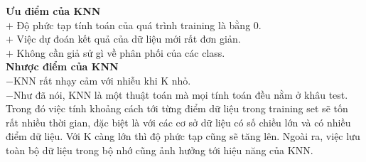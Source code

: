 \documentclass{article}
\begin{document}
\textbf{Ưu điểm của KNN}
\\
$+$ Độ phức tạp tính toán của quá trình training là bằng 0.
\\
$+$ Việc dự đoán kết quả của dữ liệu mới rất đơn giản.
\\
$+$ Không cần giả sử gì về phân phối của các class.
\\
\textbf{Nhược điểm của KNN}
\\
$-$KNN rất nhạy cảm với nhiễu khi K nhỏ.
\\
$-$Như đã nói, KNN là một thuật toán mà mọi tính toán đều nằm ở khâu test. Trong đó việc tính khoảng cách tới từng điểm dữ liệu trong training set sẽ tốn rất nhiều thời gian, đặc biệt là với các cơ sở dữ liệu có số chiều lớn và có nhiều điểm dữ liệu. Với K càng lớn thì độ phức tạp cũng sẽ tăng lên. Ngoài ra, việc lưu toàn bộ dữ liệu trong bộ nhớ cũng ảnh hưởng tới hiệu năng của KNN.
\end{document}
